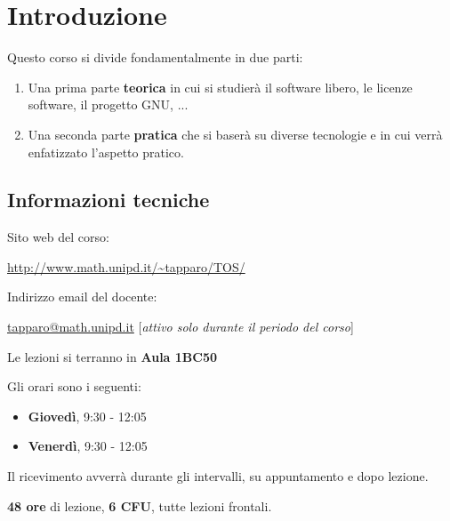 \section{Introduzione}

Questo corso si divide fondamentalmente in due parti:

\begin{enumerate}

	\item Una prima parte \textbf{teorica} in cui si studierà il software libero, le licenze software, il progetto GNU, ...
	\item Una seconda parte \textbf{pratica} che si baserà su diverse tecnologie e in cui verrà enfatizzato l'aspetto pratico.

\end{enumerate}

\subsection{Informazioni tecniche}

Sito web del corso:

\begin{center}

\url{http://www.math.unipd.it/~tapparo/TOS/}

\end{center}

Indirizzo email del docente:

\begin{center}

\url{tapparo@math.unipd.it} [\textit{attivo solo durante il periodo del corso}]

\end{center}

Le lezioni si terranno in \textbf{Aula 1BC50}

Gli orari sono i seguenti:

\begin{itemize}

\item \textbf{Giovedì}, 9:30 - 12:05
\item \textbf{Venerdì}, 9:30 - 12:05

\end{itemize}

Il ricevimento avverrà durante gli intervalli, su appuntamento e dopo lezione.

\textbf{48 ore} di lezione, \textbf{6 CFU}, tutte lezioni frontali.

